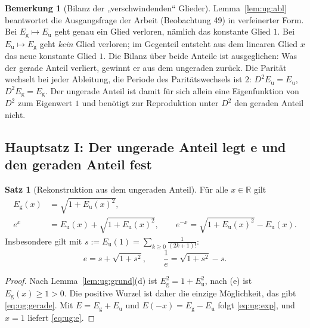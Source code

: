 \documentclass[a4paper,12pt,twoside]{report}
\theoremstyle{definition}
\newtheorem{satz}{Satz}
\newtheorem{bemerkung}{Bemerkung}
\begin{document}
\begin{bemerkung}[Bilanz der „verschwindenden“ Glieder]\label{bem:ug:bilanz}
Lemma~\ref{lem:ug:abl} beantwortet die Ausgangsfrage der Arbeit (Beobachtung 49) in verfeinerter Form. Bei $E_{\mathrm g}\mapsto E_{\mathrm u}$ geht genau ein Glied verloren, nämlich das konstante Glied $1$. Bei $E_{\mathrm u}\mapsto E_{\mathrm g}$ geht \emph{kein} Glied verloren; im Gegenteil entsteht aus dem linearen Glied $x$ das neue konstante Glied $1$. Die Bilanz über beide Anteile ist ausgeglichen: Was der gerade Anteil verliert, gewinnt er aus dem ungeraden zurück. Die Parität wechselt bei jeder Ableitung, die Periode des Paritätswechsels ist $2$: $D^2E_{\mathrm u}=E_{\mathrm u}$, $D^2E_{\mathrm g}=E_{\mathrm g}$. Der ungerade Anteil ist damit für sich allein eine Eigenfunktion von $D^2$ zum Eigenwert $1$ und benötigt zur Reproduktion unter $D^2$ den geraden Anteil nicht.
\end{bemerkung}

\subsection{Hauptsatz I: Der ungerade Anteil legt e und den geraden Anteil fest}
\label{sec:ug:haupt1}

\begin{satz}[Rekonstruktion aus dem ungeraden Anteil]\label{satz:ug:rekon}
Für alle $x\in\mathbb{R}$ gilt
\begin{align}
E_{\mathrm g}(x)&=\sqrt{1+E_{\mathrm u}(x)^2}, \label{eq:ug:gerade}\\
e^{x}&=E_{\mathrm u}(x)+\sqrt{1+E_{\mathrm u}(x)^2}, \qquad e^{-x}=\sqrt{1+E_{\mathrm u}(x)^2}-E_{\mathrm u}(x). \label{eq:ug:exp}
\end{align}
Insbesondere gilt mit $s:=E_{\mathrm u}(1)=\sum_{k\ge0}\frac1{(2k+1)!}$:
\begin{equation}\label{eq:ug:e}
e=s+\sqrt{1+s^2},\qquad \frac1e=\sqrt{1+s^2}-s .
\end{equation}
\end{satz}

\begin{proof}
Nach Lemma~\ref{lem:ug:grund}(d) ist $E_{\mathrm g}^2=1+E_{\mathrm u}^2$, nach (e) ist $E_{\mathrm g}(x)\ge1>0$. Die positive Wurzel ist daher die einzige Möglichkeit, das gibt \eqref{eq:ug:gerade}. Mit $E=E_{\mathrm g}+E_{\mathrm u}$ und $E(-x)=E_{\mathrm g}-E_{\mathrm u}$ folgt \eqref{eq:ug:exp}, und $x=1$ liefert \eqref{eq:ug:e}.
\end{proof}
\end{document}
